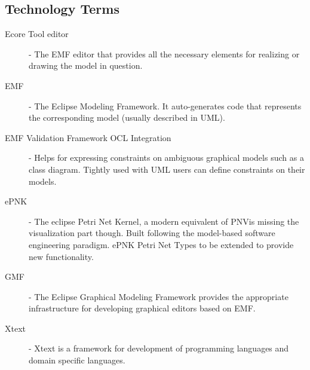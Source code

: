 \subsection{Technology Terms}
\begin{description}
\item[Ecore Tool editor] - The EMF editor that provides all the necessary elements for realizing or drawing the model in question.
\item[EMF] - The Eclipse Modeling Framework. It auto-generates code that represents the corresponding model (usually described in UML).
\item[EMF Validation Framework OCL Integration] -  Helps for expressing constraints on ambiguous graphical models such as a class diagram. Tightly used with UML users can define constraints on their models.
\item[ePNK] - The eclipse Petri Net  Kernel, a modern equivalent of PNVis missing the visualization part though. Built following the model-based software engineering paradigm. ePNK Petri Net Types to be extended to provide new functionality.
\item[GMF] - The Eclipse Graphical Modeling Framework provides the appropriate infrastructure for developing graphical editors based on EMF.
\item[Xtext] - Xtext is a framework for development of programming languages and domain specific languages.
\end{description}
